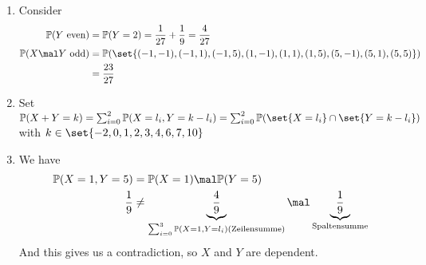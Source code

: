 \subsection{}
\begin{solution}
	\begin{enumerate}
		\item Consider\
		\begin{align*}
			\meas(Y \text{ even}) &= \meas(Y=2) = \frac{1}{27} + \frac{1}{9} = \frac{4}{27}\\
			\meas(X\mal Y \text{ odd}) &= \meas(\set{(-1,-1), (-1,1),(-1,5),(1,-1),(1,1),(1,5),(5,-1),(5,1),(5,5)})\\
			&= \frac{23}{27}
		\end{align*}
		\item Set $\meas(X+Y = k) = \sum_{i=0}^2 \meas(X=l_i , Y= k -l_i) = \sum_{i=0}^2 \meas(\set{X=l_i} \cap \set{Y = k-l_i})$ with $k \in \set{-2,0,1,2,3,4,6,7,10}$
		\item We have 
		\begin{align*}
			\meas(X=1,Y=5) &= \meas(X=1) \mal \meas(Y=5)\\
			\frac{1}{9}&\neq \underbrace{\frac{4}{9}}_{\sum_{i=0}^3 \meas(X=1, Y=l_i) \text{(Zeilensumme)}} \mal \underbrace{\frac{1}{9}}_{\text{Spaltensumme}}
		\end{align*}
		And this gives us a contradiction, so $X$ and $Y$ are dependent.
	\end{enumerate}
\end{solution}
